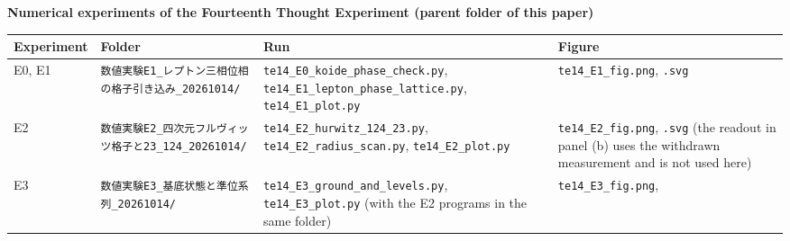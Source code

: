 \documentclass[
  a4paper,
]{article}
\newcounter{none} %
\begin{document}
\textbf{Numerical experiments of the Fourteenth Thought Experiment
(parent folder of this paper)}

{\def\LTcaptype{none} %
\begin{longtable}[]{@{}
  >{\raggedright\arraybackslash}p{}
  >{\raggedright\arraybackslash}p{}
  >{\raggedright\arraybackslash}p{}
  >{\raggedright\arraybackslash}p{}@{}}
\toprule\noalign{}
\begin{minipage}[b]{\linewidth}\raggedright
Experiment
\end{minipage} & \begin{minipage}[b]{\linewidth}\raggedright
Folder
\end{minipage} & \begin{minipage}[b]{\linewidth}\raggedright
Run
\end{minipage} & \begin{minipage}[b]{\linewidth}\raggedright
Figure
\end{minipage} \\
\midrule\noalign{}
\endhead
\bottomrule\noalign{}
\endlastfoot
E0, E1 & \texttt{数値実験E1\_\allowbreak{}レプトン三相位相の格子引き込み\_\allowbreak{}20261014/\allowbreak{}}
& \texttt{te14\_\allowbreak{}E0\_\allowbreak{}koide\_\allowbreak{}phase\_\allowbreak{}check.py},
\texttt{te14\_\allowbreak{}E1\_\allowbreak{}lepton\_\allowbreak{}phase\_\allowbreak{}lattice.py}, \texttt{te14\_\allowbreak{}E1\_\allowbreak{}plot.py}
& \texttt{te14\_\allowbreak{}E1\_\allowbreak{}fig.png}, \texttt{.svg} \\
E2 & \texttt{数値実験E2\_\allowbreak{}四次元フルヴィッツ格子と23\_\allowbreak{}124\_\allowbreak{}20261014/\allowbreak{}} &
\texttt{te14\_\allowbreak{}E2\_\allowbreak{}hurwitz\_\allowbreak{}124\_\allowbreak{}23.py},
\texttt{te14\_\allowbreak{}E2\_\allowbreak{}radius\_\allowbreak{}scan.py}, \texttt{te14\_\allowbreak{}E2\_\allowbreak{}plot.py} &
\texttt{te14\_\allowbreak{}E2\_\allowbreak{}fig.png}, \texttt{.svg} (the readout in panel (b) uses
the withdrawn measurement and is not used here) \\
E3 & \texttt{数値実験E3\_\allowbreak{}基底状態と準位系列\_\allowbreak{}20261014/\allowbreak{}} &
\texttt{te14\_\allowbreak{}E3\_\allowbreak{}ground\_\allowbreak{}and\_\allowbreak{}levels.py}, \texttt{te14\_\allowbreak{}E3\_\allowbreak{}plot.py}
(with the E2 programs in the same folder) & \texttt{te14\_\allowbreak{}E3\_\allowbreak{}fig.png},

\end{longtable}}
\end{document}

